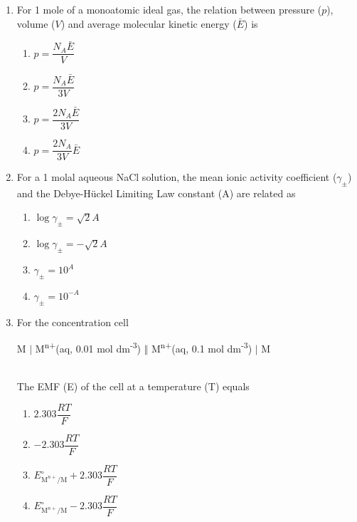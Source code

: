 \documentclass[journal,12pt,onecolumn]{IEEEtran}
\theoremstyle{remark}
\begin{document}
\begin{enumerate}
\item    \hspace{0.5cm} For 1 mole of a monoatomic ideal gas, the relation between pressure (\(p\)), volume (\(V\)) and average molecular kinetic energy (\(\bar{E}\)) is  \hfill{}

\begin{multicols}{2}
\begin{enumerate}
    \item \(p = \dfrac{N_A \bar{E}}{V}\)
    \item \(p = \dfrac{N_A \bar{E}}{3V}\)
    \item \(p = \dfrac{2 N_A \bar{E}}{3V}\)
    \item \(p = \dfrac{2 N_A}{3V} \bar{E}\)
\end{enumerate}
\end{multicols}

 

\item    \hspace{0.5cm} For a 1 molal aqueous NaCl solution, the mean ionic activity coefficient (\(\gamma_{\pm}\)) and the Debye-Hückel Limiting Law constant (A) are related as  \hfill{}

\begin{multicols}{2}
\begin{enumerate}
    \item \(\log \gamma_{\pm} = \sqrt{2} A\)
    \item \(\log \gamma_{\pm} = - \sqrt{2} A\)
    \item \(\gamma_{\pm} = 10^A\)
    \item \(\gamma_{\pm} = 10^{-A}\)
\end{enumerate}
\end{multicols}

 

\item    \hspace{0.5cm} For the concentration cell\\
\centerline{M $\vert$ M\textsuperscript{n+}(aq, 0.01 mol dm\textsuperscript{-3}) $\Vert$ M\textsuperscript{n+}(aq, 0.1 mol dm\textsuperscript{-3}) $\vert$ M}\\
The EMF (E) of the cell at a temperature (T) equals  \hfill{}

\begin{multicols}{2}
\begin{enumerate}
    \item \(2.303 \dfrac{RT}{F}\)
    \item \(-2.303 \dfrac{RT}{F}\)
    \item \(E^\circ_{\text{M}^{n+}/\text{M}} + 2.303 \dfrac{RT}{F}\)
    \item \(E^\circ_{\text{M}^{n+}/\text{M}} - 2.303 \dfrac{RT}{F}\)
\end{enumerate}
\end{multicols}


\end{enumerate}
\end{document}
